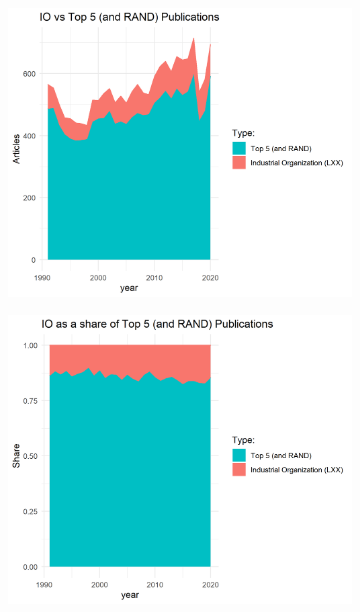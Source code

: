 \documentclass[11pt, letterpaper, twoside]{article}
\begin{document}
\begin{figure}
    \begin{subfigure}[!htbp]{0.49\textwidth}
        \centering
        \includegraphics[width=\textwidth]{LXX-code-share-area.png}
    \end{subfigure}
    \hfill
    \begin{subfigure}[!htbp]{0.49\textwidth}
        \centering
        \includegraphics[width=\textwidth]{LXX-code-share-area-normalized.png}
    \end{subfigure}
\end{figure}
\end{document}
